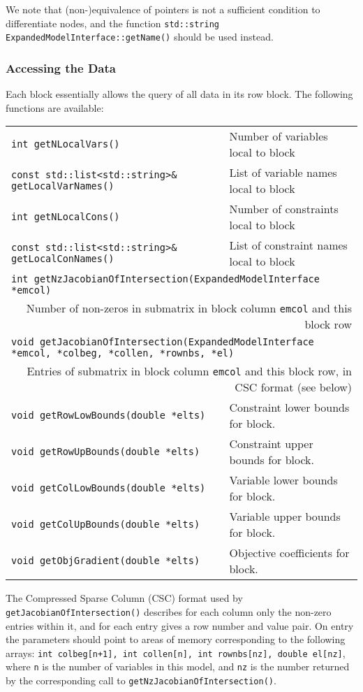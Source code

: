 \documentclass[10pt,a4paper]{book}
\begin{document}
\begin{verbtaim}
We note that (non-)equivalence of pointers is not a sufficient condition to
differentiate nodes, and the function {\tt std::string
ExpandedModelInterface::getName()} should be used instead.

\subsubsection{Accessing the Data}
Each block essentially allows the query of all data in its row block. The
following functions are available:
\begin{tabular}{ll}
{\tt int getNLocalVars()} & 
   Number of variables local to block \\
{\tt const std::list<std::string>\& getLocalVarNames()} &
   List of variable names local to block \\
{\tt int getNLocalCons()} & 
   Number of constraints local to block \\
{\tt const std::list<std::string>\& getLocalConNames()} &
   List of constraint names local to block \\
\multicolumn{2}{l}{\tt int getNzJacobianOfIntersection(ExpandedModelInterface *emcol)}\\
\multicolumn{2}{r}{Number of non-zeros in submatrix in block column {\tt emcol}
   and this block row} \\
\multicolumn{2}{l}{\tt void getJacobianOfIntersection(ExpandedModelInterface *emcol,
      *colbeg, *collen, *rownbs, *el)} \\
\multicolumn{2}{r}{Entries of submatrix in block column {\tt emcol} and this
   block row, in CSC format (see below)} \\
{\tt void getRowLowBounds(double *elts)} &
   Constraint lower bounds for block. \\
{\tt void getRowUpBounds(double *elts)} &
   Constraint upper bounds for block. \\
{\tt void getColLowBounds(double *elts)} &
   Variable lower bounds for block. \\
{\tt void getColUpBounds(double *elts)} &
   Variable upper bounds for block. \\
{\tt void getObjGradient(double *elts)} &
   Objective coefficients for block.
\end{tabular}

The Compressed Sparse Column (CSC) format used by 
{\tt getJacobianOfIntersection()} describes for each column only the non-zero
entries within it, and for each entry gives a row number and value pair. On
entry the parameters should point to areas of memory corresponding to the
following arrays: {\tt int colbeg[n+1], int collen[n], int rownbs[nz],
double el[nz]}, where {\tt n} is the number of variables in this model, and
{\tt nz} is the number returned by the corresponding call to
{\tt getNzJacobianOfIntersection()}.


\end{verbtaim}
\end{document}
